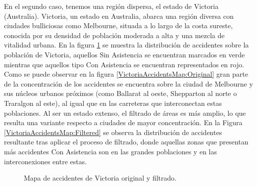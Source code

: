 \documentclass{uathesis-es}
\begin{document}
{En el segundo caso, tenemos una región dispersa, el estado de Victoria (Australia). Victoria, un estado en Australia, abarca una región diversa con ciudades bulliciosas como Melbourne, situada a lo largo de la costa sureste, conocida por su densidad de población moderada a alta y una mezcla de vitalidad urbana. En la figura \ref{VictoriaAccidentsMap} se muestra la distribución de accidentes sobre la población de Victoria, aquellos Sin Asistencia se encuentran marcados en verde mientras que aquellos tipo Con Asistencia se encuentran representados en rojo. Como se puede observar en la figura \ref{VictoriaAccidentsMap:Original} gran parte de la concentración de los accidentes se encuentra sobre la ciudad de Melbourne y sus núcleos urbanos próximos (como Ballarat al oeste, Shepparton al norte o Traralgon al este), al igual que en las carreteras que interconectan estas poblaciones. Al ser un estado extenso, el filtrado de áreas es más amplio, lo que resulta una variante respecto a ciudades de mayor concentración. En la Figura \ref{VictoriaAccidentsMap:Filtered} se observa la distribución de accidentes resultante tras aplicar el proceso de filtrado, donde aquellas zonas que presentan más accidentes Con Asistencia son en las grandes poblaciones y en las interconexiones entre estas.


 \begin{figure}[H]
     \centering
     \caption{Mapa de accidentes de Victoria original y filtrado.}
     \label{VictoriaAccidentsMap}
 \end{figure}


}
\end{document}
